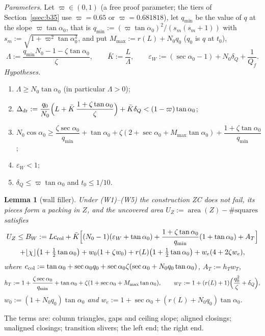 \documentclass[11pt]{amsart}
\newcommand{\caz}{\cos\alpha_0}
\newcommand{\taz}{\tan\alpha_0}
\newcommand{\sez}{\sec\alpha_0}
\newcommand{\Kb}{\bar K}
\newtheorem{lemma}[theorem]{Lemma}
\theoremstyle{definition}
\theoremstyle{remark}
\numberwithin{equation}{section}
\begin{document}
\emph{Parameters.} Let $\varpi\in(0,1)$ (a free proof parameter; the tiers of Section~\ref{ssec:b35} use $\varpi=0.65$
or $\varpi=0.681818$), let $q_{\min}$ be the value of $q$ at the slope
$\varpi\taz$, that is $q_{\min}:=(\varpi\taz)^2/(s_m(s_m+1))$ with $s_m:=\sqrt{1+\varpi^2\taz^2}$, and put
$M_{\max}:=r(L)+N_0q_0$ ($q_0$ is $q$ at $t_0$),
\[
\Lambda:=\frac{q_{\min}N_0-1-\zeta\taz}{\zeta},\qquad \Kb:=\frac L\Lambda,\qquad
\varepsilon_W:=(\sez-1)+N_0\delta_Q+\frac1{Q_f}.
\]
\emph{Hypotheses.}
\begin{enumerate}[label=(W\arabic*)]
\item $\Lambda\ge N_0\taz$ (in particular $\Lambda>0$);
\item $\Delta_{\rm dr}:=\dfrac{q_0}{N_0}\Bigl(L+\Kb\,\dfrac{1+\zeta\taz}{\zeta}\Bigr)+\Kb\delta_Q<(1-\varpi)\taz$;
\item $N_0\caz\ge\dfrac{\zeta\sez}{q_{\min}}+\taz+\zeta(2+\sez+M_{\max}\taz)+\dfrac{1+\zeta\taz}{q_{\min}}$;
\item $\varepsilon_W<1$;
\item $\delta_Q\le\varpi\taz$ and $t_0\le1/10$.
\end{enumerate}

\begin{lemma}[wall filler]\label{lem:W}
Under (W1)--(W5) the construction ZC does not fail, its pieces form a packing in $Z$, and the uncovered area
$U_Z:=\operatorname{area}(Z)-\#\text{squares}$ satisfies
\begin{multline*}
U_Z\le B_W:=Lc_{\rm col}+\Kb\Bigl[(N_0-1)(\varepsilon_W+\taz)+\frac{1+\zeta\taz}{q_{\min}}(1+\taz)+A_T\Bigr]\\
+\lfloor\chi\rfloor\bigl(1+\tfrac12\taz\bigr)+w_0(1+\zeta w_0)+r(L)\bigl(1+\tfrac12\taz\bigr)+w_e(4+2\zeta w_e),
\end{multline*}
where $c_{\rm col}:=\taz+\sez q_0+\sez\zeta(\sez+N_0q_0\taz)$, $A_T:=h_Tw_T$,
\[
h_T:=1+\frac{\zeta\sez}{q_{\min}}+\taz+\zeta(1+\sez+M_{\max}\taz),\qquad
w_T:=1+(r(L)+1)\Bigl(\frac{q_0^2}\zeta+\delta_Q\Bigr),
\]
$w_0:=(1+N_0q_0)\taz$ and $w_e:=1+\sez+(r(L)+N_0q_0)\taz$.
\end{lemma}

The terms are: column triangles, gaps and ceiling slope; aligned closings; unaligned closings; transition slivers; the
left end; the right end.
\end{document}
